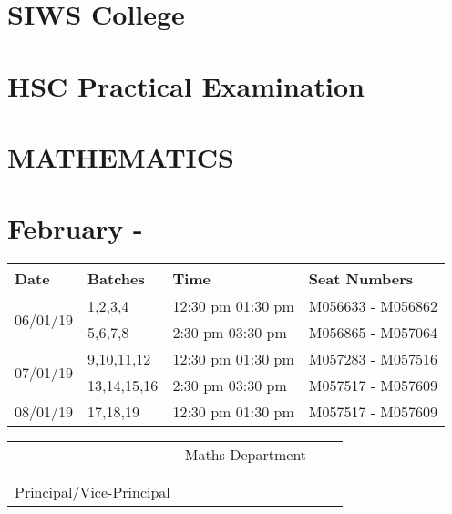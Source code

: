 \documentclass[17pt]{extarticle}
\begin{document}
\section*{SIWS College}
\section*{HSC Practical Examination }
\section*{MATHEMATICS}
\section*{February - \the\year }
\vspace{1cm}
\begin{center}
\begin{tabular}{ | m{2.5cm} | m{2.7cm}| m{4.6cm} |  m{6cm} | } 
  \hline
  Date
  &Batches
  &Time
  &Seat Numbers
  \\ 
   
  \hline
  \multirow{2}{*}{06/01/19 }
  &1,2,3,4
  &12:30 pm 01:30 pm 
  &M056633 - M056862 \\\cline{2-4}
  
  & 5,6,7,8
  & 2:30 pm 03:30 pm
  & M056865 - M057064
  \\ 
    
  \hline
   \multirow{2}{*}{07/01/19 }
    & 9,10,11,12 
    & 12:30 pm 01:30 pm
    &M057283 - M057516 \\\cline{2-4}
    
    & 13,14,15,16 
    & 2:30 pm 03:30 pm 
    &M057517 - M057609
    \\ 
  \hline

    08/01/19 
    & 17,18,19
    & 12:30 pm 01:30 pm 
    &M057517 - M057609
    \\ 
  \hline


\end{tabular}
\vspace{1cm}

\end{center}
\vspace{2.1cm}

\begin{tabu} to 1\textwidth {X[l] X[r]}
  & Maths Department\ \ \ \  \\
 \\ \\ 
  Principal/Vice-Principal&
\end{tabu}
\end{document}
